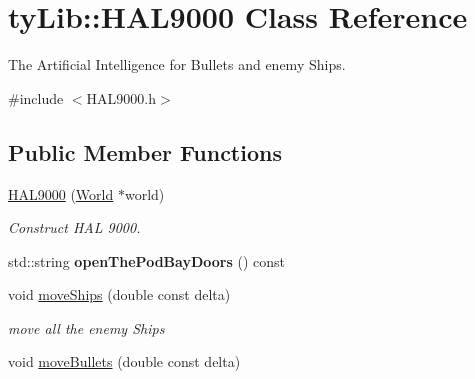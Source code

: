 \hypertarget{classty_lib_1_1_h_a_l9000}{}\section{ty\+Lib\+:\+:H\+A\+L9000 Class Reference}
\label{classty_lib_1_1_h_a_l9000}


The Artificial Intelligence for Bullets and enemy Ships.  




{\ttfamily \#include $<$H\+A\+L9000.\+h$>$}

\subsection*{Public Member Functions}
\begin{DoxyCompactItemize}
\item 
\hypertarget{classty_lib_1_1_h_a_l9000_a8d2ccd4c0e7b3889414cd6aecc2bf289}{}\hyperlink{classty_lib_1_1_h_a_l9000_a8d2ccd4c0e7b3889414cd6aecc2bf289}{H\+A\+L9000} (\hyperlink{classty_lib_1_1_world}{World} $\ast$world)\label{classty_lib_1_1_h_a_l9000_a8d2ccd4c0e7b3889414cd6aecc2bf289}

\begin{DoxyCompactList}\small\item\em Construct H\+A\+L 9000. \end{DoxyCompactList}\item 
\hypertarget{classty_lib_1_1_h_a_l9000_ac36e207a940a6385671a89391d2e8b77}{}std\+::string {\bfseries open\+The\+Pod\+Bay\+Doors} () const \label{classty_lib_1_1_h_a_l9000_ac36e207a940a6385671a89391d2e8b77}

\item 
\hypertarget{classty_lib_1_1_h_a_l9000_a3ee35680450854a78a63e1a663976034}{}void \hyperlink{classty_lib_1_1_h_a_l9000_a3ee35680450854a78a63e1a663976034}{move\+Ships} (double const delta)\label{classty_lib_1_1_h_a_l9000_a3ee35680450854a78a63e1a663976034}

\begin{DoxyCompactList}\small\item\em move all the enemy Ships \end{DoxyCompactList}\item 
\hypertarget{classty_lib_1_1_h_a_l9000_a9010a314f88488392ff5a0243bb69d01}{}void \hyperlink{classty_lib_1_1_h_a_l9000_a9010a314f88488392ff5a0243bb69d01}{move\+Bullets} (double const delta)\label{classty_lib_1_1_h_a_l9000_a9010a314f88488392ff5a0243bb69d01}


\end{DoxyCompactItemize}
